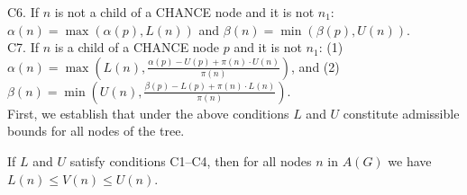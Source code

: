 \documentclass[runningheads]{llncs}
\newcommand{\MM}{\mathit{V}}
\newcommand{\pess}{\mathit{L}}
\newcommand{\opti}{\mathit{U}}
\newcommand{\rootnode}{\mathit{n_1}}
\begin{document}
\noindent C6. If $n$ is not a child of a CHANCE node and it is not $\rootnode$:
$\alpha(n)=\max(\alpha(p),\pess(n))$ and 
$\beta(n)=\min(\beta(p),\opti(n))$. \\

\noindent C7. If $n$ is a child of a CHANCE node $p$ and it is not $\rootnode$:
(1) $\alpha(n) = \max(\pess(n), \frac{\alpha(p)-\opti(p)+\pi(n)\cdot\opti(n)}{\pi(n)})$, 
and (2) $\beta(n) = \min(\opti(n), \frac{\beta(p)-\pess(p)+\pi(n)\cdot\pess(n)}{\pi(n)})$.\\

First, we establish that under the above conditions $\pess$ and $\opti$ constitute admissible bounds for all nodes of the tree.

\begin{lemma}
  If $\pess$ and $\opti$ satisfy conditions C1--C4, then for all nodes $n$ in $A(G)$ we have $\pess(n)\leq \MM(n)\leq \opti(n)$.
\label{lem:opti-pess}
\end{lemma}
\end{document}
